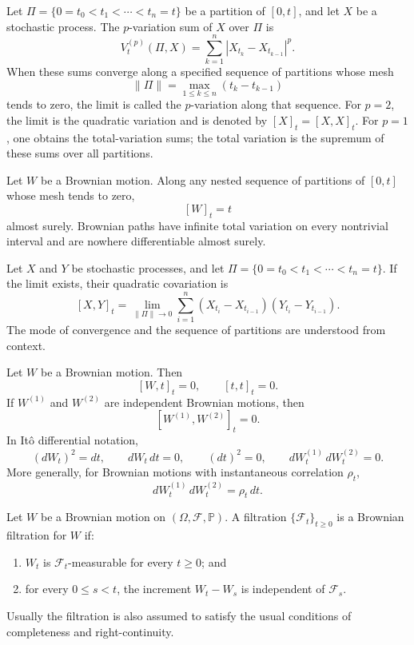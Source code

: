 \begin{de}
Let $\Pi=\{0=t_0<t_1<\cdots<t_n=t\}$ be a partition of $[0,t]$, and let $X$ be a stochastic process. The $p$-variation sum of $X$ over $\Pi$ is
\[
V_t^{(p)}(\Pi,X)=\sum_{k=1}^n |X_{t_k}-X_{t_{k-1}}|^p.
\]
When these sums converge along a specified sequence of partitions whose mesh
\[
\|\Pi\|=\max_{1\leq k\leq n}(t_k-t_{k-1})
\]
tends to zero, the limit is called the $p$-variation along that sequence. For $p=2$, the limit is the quadratic variation and is denoted by $[X]_t=[X,X]_t$. For $p=1$, one obtains the total-variation sums; the total variation is the supremum of these sums over all partitions.
\end{de}

\begin{thm}
Let $W$ be a Brownian motion. Along any nested sequence of partitions of $[0,t]$ whose mesh tends to zero,
\[
[W]_t=t
\]
almost surely. Brownian paths have infinite total variation on every nontrivial interval and are nowhere differentiable almost surely.
\end{thm}

\begin{de}
Let $X$ and $Y$ be stochastic processes, and let $\Pi=\{0=t_0<t_1<\cdots<t_n=t\}$. If the limit exists, their quadratic covariation is
\[
[X,Y]_t
=
\lim_{\|\Pi\|\to 0}
\sum_{i=1}^n
(X_{t_i}-X_{t_{i-1}})(Y_{t_i}-Y_{t_{i-1}}).
\]
The mode of convergence and the sequence of partitions are understood from context.
\end{de}

\begin{thm}
Let $W$ be a Brownian motion. Then
\[
[W,t]_t=0,
\qquad
[t,t]_t=0.
\]
If $W^{(1)}$ and $W^{(2)}$ are independent Brownian motions, then
\[
[W^{(1)},W^{(2)}]_t=0.
\]
In It\^o differential notation,
\[
(dW_t)^2=dt,
\qquad
dW_t\,dt=0,
\qquad
(dt)^2=0,
\qquad
dW_t^{(1)}\,dW_t^{(2)}=0.
\]
More generally, for Brownian motions with instantaneous correlation $\rho_t$,
\[
dW_t^{(1)}\,dW_t^{(2)}=\rho_t\,dt.
\]
\end{thm}

\begin{de}
Let $W$ be a Brownian motion on $(\Omega,\mathcal{F},\mathbb{P})$. A filtration $\{\mathcal{F}_t\}_{t\geq 0}$ is a Brownian filtration for $W$ if:
\begin{enumerate}
    \item $W_t$ is $\mathcal{F}_t$-measurable for every $t\geq 0$; and
    \item for every $0\leq s<t$, the increment $W_t-W_s$ is independent of $\mathcal{F}_s$.
\end{enumerate}
Usually the filtration is also assumed to satisfy the usual conditions of completeness and right-continuity.
\end{de}

